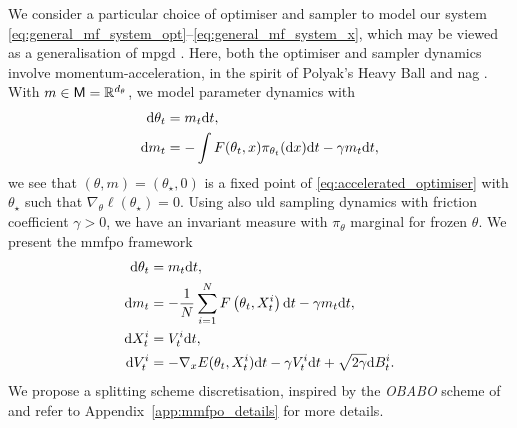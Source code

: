 We consider a particular choice of optimiser and sampler to model our system \eqref{eq:general_mf_system_opt}--\eqref{eq:general_mf_system_x}, which may be viewed as a generalisation of \gls*{mpgd}  \citep{lim2024momentumparticlemaximumlikelihood}. Here, both the optimiser and sampler dynamics involve momentum-acceleration, in the spirit of Polyak's Heavy Ball and \gls*{nag} \citep{Nesterov1983AMF}. With $m\in{\mathsf{M}}=\mathbb{R}^{d_\theta}$, we model parameter dynamics with
\begin{equation} \label{eq:accelerated_optimiser}
    \begin{aligned}
        \mathrm{d}\theta_t &=m_t\mathrm{d} t,\\
        \mathrm{d} m_t &= -\int F (\theta_t, x)\pi_{\theta_t}(\mathrm{d} x)\mathrm{d} t-\gamma m_t\mathrm{d} t,
    \end{aligned}
\end{equation}
we see that $(\theta,m)=(\theta_\star,0)$ is a fixed point of \eqref{eq:accelerated_optimiser} with $\theta_\star$ such that $\nabla_\theta\ell(\theta_\star)=0$. Using also \gls*{uld} sampling dynamics with  friction coefficient $\gamma>0$, we have an invariant measure with $\pi_\theta$ marginal for frozen $\theta$. We present the \gls*{mmfpo} framework
\begin{equation}\label{eq:alg_underdamped}
    \begin{aligned}
        \mathrm{d}\theta_t &=m_t\mathrm{d} t,\\
        \mathrm{d} m_t &= -\frac{1}{N}\sum_{i=1}^N{F}\left(\theta_t, X^i_t\right)\mathrm{d} t-\gamma m_t\mathrm{d} t
        ,\\
        \mathrm{d} X^i_t&=V_t^i \mathrm{d} t,\\
        \mathrm{d} V^i_t&=-\nabla_x E(\theta_t, X^i_t)\mathrm{d} t-\gamma V_t^i\mathrm{d} t+\sqrt{2\gamma}\mathrm{d} B^i_t.
    \end{aligned}
\end{equation}
We propose a splitting scheme discretisation, inspired by the \textit{OBABO} scheme of \citet{obabo_ref_leimkuhler_matthews} and refer to Appendix~\ref{app:mmfpo_details} for more details.

